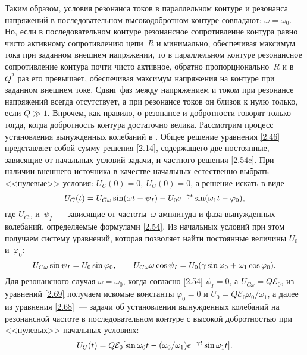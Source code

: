 Таким образом, условия резонанса токов в параллельном контуре и резонанса
напряжений в последовательном высокодобротном контуре совпадают:
$\omega=\omega_0$. Но, если в последовательном контуре резонансное сопротивление
контура равно чисто активному сопротивлению цепи~$R$ и минимально, обеспечивая
максимум тока при заданном внешнем напряжении, то в параллельном контуре
резонансное сопротивление контура почти чисто активное, обратно
пропорционально~$R$ и в~$Q^2$ раз его превышает, обеспечивая максимум напряжения
на контуре при заданном внешнем токе. Сдвиг фаз между напряжением и током при
резонансе напряжений всегда отсутствует, а при резонансе токов он близок к нулю
только, если $Q\gg1$. Впрочем, как правило, о резонансе и добротности говорят только тогда, когда добротность контура достаточно велика.
Рассмотрим процесс установления вынужденных колебаний в
. Общее решение уравнения
\eqref{2.46} представляет собой сумму решения \eqref{2.14}, содержащего две
постоянные, зависящие от начальных условий задачи, и частного решения
\eqref{2.54c}. При наличии внешнего источника в качестве начальных естественно
выбрать <<нулевые>> условия: $U_C(0)=0,~\dot U_C(0)=0$, а решение искать в виде
\begin{equation}
	\eqmark{2.68}
	U_C(t)=U_{C\omega}\sin(\omega t-\psi_I)-U_0e^{-\gamma
t}\sin(\omega_1t-\varphi_0),
\end{equation}
где $U_{C\omega}$ и~$\psi_I$~--- зависящие от частоты~$\omega$ амплитуда и фаза
вынужденных колебаний, определяемые формулами \eqref{2.54}. Из начальных условий
при этом получаем систему уравнений, которая позволяет найти постоянные величины
$U_0$ и~$\varphi_0$:
\begin{equation}
	\eqmark{2.69}
	U_{C\omega}\sin\psi_I=U_0\sin\varphi_0, \qquad
U_{C\omega}\omega\cos\psi_I=U_0(\gamma\sin\varphi_0+\omega_1\cos\varphi_0).
\end{equation}
Для резонансного случая $\omega=\omega_0$, когда согласно \eqref{2.54}
$\psi_I=0$, а $U_{C\omega}=Q\mathcal{E}_0$, из уравнений \eqref{2.69} получаем
искомые константы $\varphi_0=0$ и $U_0=Q\mathcal{E}_0\omega_0/\omega_1$, а далее
из уравнения \eqref{2.68}~---  задачи об установлении
вынужденных колебаний на резонансной частоте в последовательном контуре с
высокой добротностью при <<нулевых>> начальных условиях:
\begin{equation}
	\eqmark{2.70}
	U_{C}(t)=Q\mathcal{E}_0[\sin\omega_0t-(\omega_0/\omega_1)e^{-\gamma
t}\sin\omega_1 t].
\end{equation}
